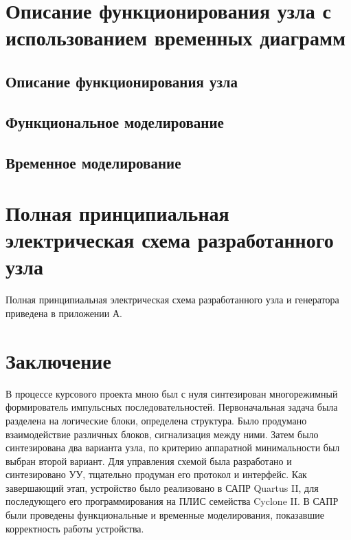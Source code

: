 \documentclass[a4paper,14pt,russian]{article}
\begin{document}
\section{Описание функционирования узла с использованием временных диаграмм}
\label{sections:func}
\subsection{Описание функционирования узла}

\subsection{Функциональное моделирование} 

\subsection{Временное моделирование}


\section{Полная принципиальная электрическая схема разработанного узла}
Полная принципиальная электрическая схема разработанного узла и генератора приведена в приложении А.

\section*{Заключение}
В процессе курсового проекта мною был с нуля синтезирован многорежимный формирователь импульсных последовательностей. Первоначальная задача была разделена на логические блоки, определена структура. Было продумано взаимодействие различных блоков, сигнализация между ними. Затем было синтезирована два варианта узла, по критерию аппаратной минимальности был выбран второй вариант. Для управления схемой была разработано и синтезировано УУ, тщательно продуман его протокол и интерфейс. Как завершающий этап, устройство было реализовано в САПР Quartus II, для последующего его программирования на ПЛИС семейства Cyclone II. В САПР были проведены функциональные и временные моделирования, показавшие корректность работы устройства.

\renewcommand\refname{Список использованной литературы}
\nocite{*}


\clearpage
\appendix
\end{document}
